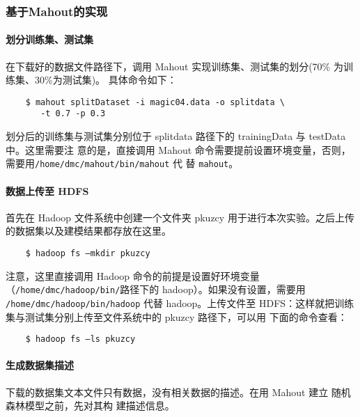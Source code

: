 \subsubsection{基于Mahout的实现}\label{ux57faux4e8emahoutux7684ux5b9eux73b0}

\paragraph{划分训练集、测试集}\label{ux5212ux5206ux8badux7ec3ux96c6ux6d4bux8bd5ux96c6}

在下载好的数据文件路径下，调用 Mahout 实现训练集、测试集的划分(70\%
为训练集、30\%为测试集)。 具体命令如下：

\begin{lstlisting}
	$ mahout splitDataset -i magic04.data -o splitdata \
	   -t 0.7 -p 0.3
\end{lstlisting}

划分后的训练集与测试集分别位于 splitdata 路径下的 trainingData 与
testData 中。这里需要注 意的是，直接调用 Mahout
命令需要提前设置环境变量，否则，需要用\texttt{/home/dmc/mahout/bin/mahout} 代 替
\texttt{mahout}。

\paragraph{数据上传至 HDFS}\label{ux6570ux636eux4e0aux4f20ux81f3-hdfs}

首先在 Hadoop 文件系统中创建一个文件夹 pkuzcy
用于进行本次实验。之后上传的数据集以及建模结果都存放在这里。

\begin{lstlisting}
	$ hadoop fs –mkdir pkuzcy
\end{lstlisting}

注意，这里直接调用 Hadoop 命令的前提是设置好环境变量
（\lstinline{/home/dmc/hadoop/bin/}路径下的 hadoop）。如果没有设置，需要用
\lstinline{/home/dmc/hadoop/bin/hadoop} 代替 hadoop。上传文件至 HDFS：这样就把训练
集与测试集分别上传至文件系统中的 pkuzcy 路径下，可以用 下面的命令查看：

\begin{lstlisting}
	$ hadoop fs –ls pkuzcy
\end{lstlisting}

\paragraph{生成数据集描述}\label{ux751fux6210ux6570ux636eux96c6ux63cfux8ff0}

下载的数据集文本文件只有数据，没有相关数据的描述。在用 Mahout 建立
随机森林模型之前，先对其构 建描述信息。

